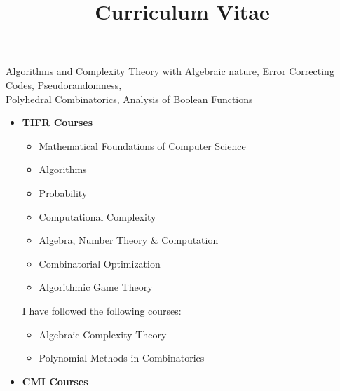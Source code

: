 \documentclass[a4paper,skipsamekey,11pt,english]{curve}
\title{Curriculum Vitae}
\begin{document}
\makeheaders[c]

Algorithms and Complexity Theory with Algebraic nature, Error Correcting Codes, Pseudorandomness, \\
Polyhedral Combinatorics, Analysis of Boolean Functions

% 
\begin{itemize}
	\item \textbf{TIFR Courses}
	      \begin{multicols}{2}
		      \begin{itemize}
			      \item Mathematical Foundations of Computer Science
			      \item Algorithms
			      \item Probability
			      \item Computational Complexity
			      \item Algebra, Number Theory \& Computation
			      \item Combinatorial Optimization
			      \item Algorithmic Game Theory
		      \end{itemize}
	      \end{multicols}I have followed the following courses:
	      \begin{multicols}{2}
		      \begin{itemize}
			      \item Algebraic Complexity Theory
			      \item Polynomial Methods in Combinatorics
		      \end{itemize}
	      \end{multicols}\newpage
	\item \textbf{CMI Courses}



\end{itemize}
\end{document}
